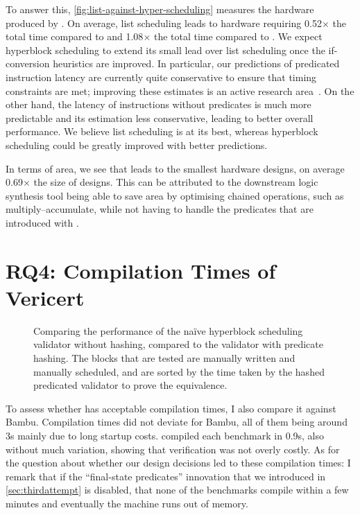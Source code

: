 To answer this, \cref{fig:list-against-hyper-scheduling} measures the hardware produced by \VericertList{}. On average, list scheduling leads to hardware requiring 0.52$\times$ the total time compared to \VericertBase{} and 1.08$\times$ the total time compared to \VericertHyper{}. We expect hyperblock scheduling to extend its small lead over list scheduling once the if-conversion heuristics are improved.  In particular, our predictions of predicated instruction latency are currently quite conservative to ensure that timing constraints are met; improving these estimates is an active research area~\cite{tan15_mappin_lut_fpgas,rizzi23_iterat_method_mappin_aware_frequen,wang23_mapbuf,ustun20_accur_fpga_hls,zheng14_fast_effec_placem_routin_direc}.
On the other hand, the latency of instructions without predicates is much more predictable and its estimation less conservative, leading to better overall performance. We believe list scheduling is at its best, whereas hyperblock scheduling could be greatly improved with better predictions.

In terms of area, we see that \VericertList{} leads to the smallest hardware designs, on average 0.69$\times$ the size of \VericertHyper{} designs. This can be attributed to the downstream logic synthesis tool being able to save area by optimising chained operations, such as multiply--accumulate, while not having to handle the predicates that are introduced with \VericertHyper{}.

\section{RQ4: Compilation Times of Vericert}

\begin{figure}
  \centering
  \resizebox{\linewidth}{!}{}
  \caption[Comparing the performance of predicate validators.]{Comparing the
    performance of the na\"ive hyperblock scheduling validator without hashing,
    compared to the validator with predicate hashing.  The blocks that are
    tested are manually written and manually scheduled, and are sorted by the
    time taken by the hashed predicated validator to prove the equivalence.}%
  \label{fig:eval:comparison-hashing}
\end{figure}

To assess whether \VericertHyper{} has acceptable compilation times, I also
compare it against Bambu.  Compilation times did not deviate for Bambu, all of
them being around 3s mainly due to long startup costs. \VericertHyper{} compiled
each benchmark in 0.9s, also without much variation, showing that verification
was not overly costly.  As for the question about whether our design decisions
led to these compilation times: I remark that if the \enquote{final-state
  predicates} innovation that we introduced in \cref{sec:thirdattempt} is
disabled, that none of the benchmarks compile within a few minutes and
eventually the machine runs out of memory.

